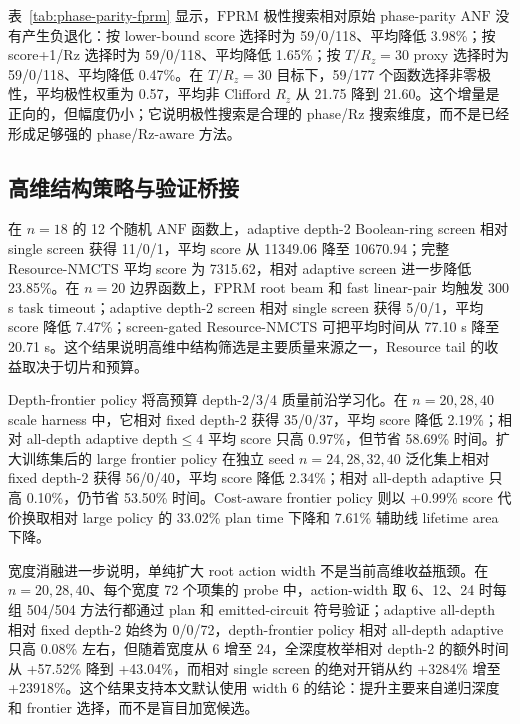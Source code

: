 \documentclass[UTF8,fontset=macnew,11pt]{ctexart}
\newcommand{\method}{Resource-NMCTS}
\newcommand{\anf}{\ensuremath{\mathrm{ANF}}}
\newcommand{\fprm}{\ensuremath{\mathrm{FPRM}}}
\newcommand{\rz}{\ensuremath{R_z}}
\begin{document}
\begin{table}[H]
\centering
\small
\caption{Fixed-polarity phase-parity search。每个函数枚举全部 $2^n$ 个极性，按 lower-bound score、score+1/Rz 和 $T/R_z=30$ proxy 三个目标分别选择最优极性；共 531 行全部 up-to-global-phase 验证通过。}
\label{tab:phase-parity-fprm}

\end{table}

表~\ref{tab:phase-parity-fprm} 显示，\fprm{} 极性搜索相对原始 phase-parity \anf{} 没有产生负退化：按 lower-bound score 选择时为 59/0/118、平均降低 3.98\%；按 score+1/Rz 选择时为 59/0/118、平均降低 1.65\%；按 $T/R_z=30$ proxy 选择时为 59/0/118、平均降低 0.47\%。在 $T/R_z=30$ 目标下，59/177 个函数选择非零极性，平均极性权重为 0.57，平均非 Clifford \rz{} 从 21.75 降到 21.60。这个增量是正向的，但幅度仍小；它说明极性搜索是合理的 phase/Rz 搜索维度，而不是已经形成足够强的 phase/Rz-aware 方法。

\subsection{高维结构策略与验证桥接}

在 $n=18$ 的 12 个随机 \anf{} 函数上，adaptive depth-2 Boolean-ring screen 相对 single screen 获得 11/0/1，平均 score 从 11349.06 降至 10670.94；完整 \method{} 平均 score 为 7315.62，相对 adaptive screen 进一步降低 23.85\%。在 $n=20$ 边界函数上，FPRM root beam 和 fast linear-pair 均触发 300 s task timeout；adaptive depth-2 screen 相对 single screen 获得 5/0/1，平均 score 降低 7.47\%；screen-gated \method{} 可把平均时间从 77.10 s 降至 20.71 s。这个结果说明高维中结构筛选是主要质量来源之一，Resource tail 的收益取决于切片和预算。

Depth-frontier policy 将高预算 depth-2/3/4 质量前沿学习化。在 $n=20,28,40$ scale harness 中，它相对 fixed depth-2 获得 35/0/37，平均 score 降低 2.19\%；相对 all-depth adaptive depth$\leq4$ 平均 score 只高 0.97\%，但节省 58.69\% 时间。扩大训练集后的 large frontier policy 在独立 seed $n=24,28,32,40$ 泛化集上相对 fixed depth-2 获得 56/0/40，平均 score 降低 2.34\%；相对 all-depth adaptive 只高 0.10\%，仍节省 53.50\% 时间。Cost-aware frontier policy 则以 +0.99\% score 代价换取相对 large policy 的 33.02\% plan time 下降和 7.61\% 辅助线 lifetime area 下降。

宽度消融进一步说明，单纯扩大 root action width 不是当前高维收益瓶颈。在 $n=20,28,40$、每个宽度 72 个项集的 probe 中，action-width 取 6、12、24 时每组 504/504 方法行都通过 plan 和 emitted-circuit 符号验证；adaptive all-depth 相对 fixed depth-2 始终为 0/0/72，depth-frontier policy 相对 all-depth adaptive 只高 0.08\% 左右，但随着宽度从 6 增至 24，全深度枚举相对 depth-2 的额外时间从 +57.52\% 降到 +43.04\%，而相对 single screen 的绝对开销从约 +3284\% 增至 +23918\%。这个结果支持本文默认使用 width 6 的结论：提升主要来自递归深度和 frontier 选择，而不是盲目加宽候选。
\end{document}
